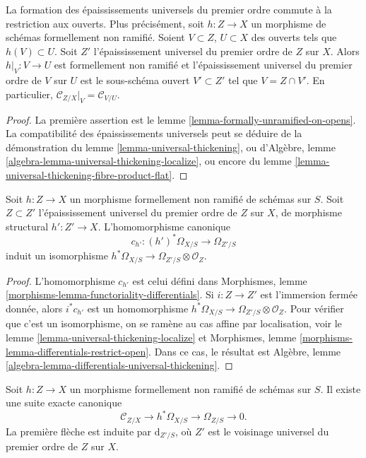 \begin{lemma}
\label{lemma-universal-thickening-localize}
La formation des épaississements universels du premier ordre commute à la restriction aux ouverts.
Plus précisément, soit $h : Z \to X$ un morphisme de schémas formellement non ramifié.
Soient $V \subset Z$, $U \subset X$ des ouverts tels que $h(V) \subset U$.
Soit $Z'$ l'épaississement universel du premier ordre de $Z$ sur $X$.
Alors $h|_V : V \to U$ est formellement non ramifié et l'épaississement universel du premier
ordre de $V$ sur $U$ est le sous-schéma ouvert $V' \subset Z'$
tel que $V = Z \cap V'$. En particulier,
$\mathcal{C}_{Z/X}|_V = \mathcal{C}_{V/U}$.
\end{lemma}

\begin{proof}
La première assertion est
le lemme \ref{lemma-formally-unramified-on-opens}.
La compatibilité des épaississements universels peut se déduire de la démonstration du
lemme \ref{lemma-universal-thickening},
ou d'Algèbre,
lemme \ref{algebra-lemma-universal-thickening-localize},
ou encore du
lemme \ref{lemma-universal-thickening-fibre-product-flat}.
\end{proof}

\begin{lemma}
\label{lemma-differentials-universally-unramified}
Soit $h : Z \to X$ un morphisme formellement non ramifié de schémas sur $S$.
Soit $Z \subset Z'$ l'épaississement universel du premier ordre de $Z$
sur $X$, de morphisme structural $h' : Z' \to X$. L'homomorphisme canonique
$$
c_{h'} : (h')^*\Omega_{X/S} \longrightarrow \Omega_{Z'/S}
$$
induit un isomorphisme
$h^*\Omega_{X/S} \to \Omega_{Z'/S} \otimes \mathcal{O}_Z$.
\end{lemma}

\begin{proof}
L'homomorphisme $c_{h'}$ est celui défini dans
Morphismes, lemme \ref{morphisms-lemma-functoriality-differentials}.
Si $i : Z \to Z'$ est l'immersion fermée donnée, alors
$i^*c_{h'}$ est un homomorphisme
$h^*\Omega_{X/S} \to \Omega_{Z'/S} \otimes \mathcal{O}_Z$.
Pour vérifier que c'est un isomorphisme, on se ramène au cas affine
par localisation, voir
le lemme \ref{lemma-universal-thickening-localize}
et
Morphismes, lemme \ref{morphisms-lemma-differentials-restrict-open}.
Dans ce cas, le résultat est
Algèbre, lemme \ref{algebra-lemma-differentials-universal-thickening}.
\end{proof}

\begin{lemma}
\label{lemma-universally-unramified-differentials-sequence}
Soit $h : Z \to X$ un morphisme formellement non ramifié de schémas sur $S$.
Il existe une suite exacte canonique
$$
\mathcal{C}_{Z/X} \to h^*\Omega_{X/S} \to \Omega_{Z/S} \to 0.
$$
La première flèche est induite par $\text{d}_{Z'/S}$, où
$Z'$ est le voisinage universel du premier ordre de $Z$ sur $X$.
\end{lemma}


